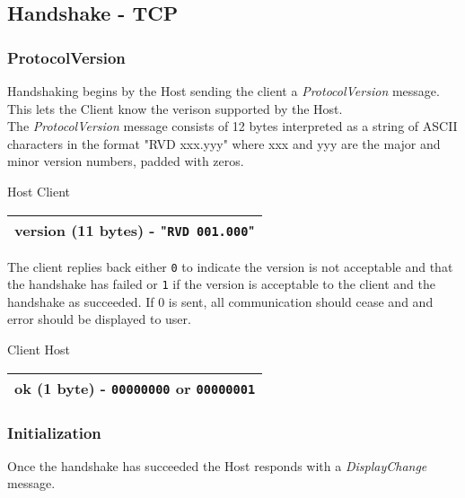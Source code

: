 \documentclass[11pt o]{article}
\begin{document}
    \subsection{Handshake - TCP}

    \subsubsection{ProtocolVersion}
    Handshaking begins by the Host sending the client a \emph{ProtocolVersion} message. This lets the Client know the verison supported by the Host.\\

    The \emph{ProtocolVersion} message consists of 12 bytes interpreted as a string of ASCII characters in the format "RVD xxx.yyy" where xxx and yyy are the major and minor version numbers, padded with zeros.

    \begin{center}
        Host \textrightarrow Client\\
        \begin{tabular}{|c|}
            \hline
            version (11 bytes) -
            "\texttt{RVD 001.000}" \\
            \hline
        \end{tabular}
    \end{center}

    The client replies back either \texttt{0} to indicate the version is not acceptable and that the handshake has failed or \texttt{1} if the version is acceptable to the client and the handshake as succeeded. If 0 is sent, all communication should cease and and error should be displayed to user.

    \begin{center}
        Client \textrightarrow Host\\
        \begin{tabular}{|c|}
            \hline
            ok (1 byte) -
            \texttt{00000000} or \texttt{00000001} \\
            \hline
        \end{tabular}
    \end{center}

    \subsubsection{Initialization}

    Once the handshake has succeeded the Host responds with a \emph{DisplayChange} message.
\end{document}
